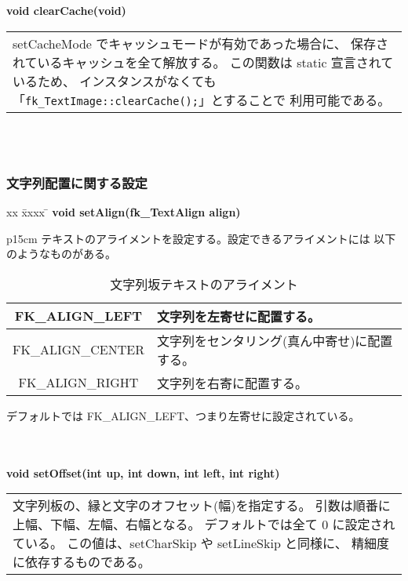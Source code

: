 \begin{tabbing}
\> \textbf{void clearCache(void)} \\
	\> \> \begin{tabular}{p{15cm}}
		setCacheMode でキャッシュモードが有効であった場合に、
		保存されているキャッシュを全て解放する。
		この関数は static 宣言されているため、
		インスタンスがなくても
		「\verb+fk_TextImage::clearCache();+」とすることで
		利用可能である。
	\end{tabular} \\ \\

\end{tabbing}

\subsubsection{文字列配置に関する設定}
\begin{tabbing}
xx \= xxxx \= \kill
\> \textbf{void setAlign(fk\_TextAlign align)} \\
	\> \> \begin{tabular}{p{15cm}}
		テキストのアライメントを設定する。設定できるアライメントには
		以下のようなものがある。
			\begin{table}[H]
			\caption{文字列坂テキストのアライメント}
			\label{tbl:textAlign}
			\begin{center}
			\begin{tabular}{|c|l|}
			\hline
			FK\_ALIGN\_LEFT & 文字列を左寄せに配置する。\\ \hline
			FK\_ALIGN\_CENTER &
			文字列をセンタリング(真ん中寄せ)に配置する。\\ \hline
			FK\_ALIGN\_RIGHT & 文字列を右寄に配置する。\\ \hline
			\end{tabular}
			\end{center}
			\end{table}
		デフォルトでは FK\_ALIGN\_LEFT、つまり左寄せに設定されている。
	\end{tabular} \\ \\

\> \textbf{void setOffset(int up, int down, int left, int right)} \\
	\> \> \begin{tabular}{p{15cm}}
		文字列板の、縁と文字のオフセット(幅)を指定する。
		引数は順番に上幅、下幅、左幅、右幅となる。
		デフォルトでは全て 0 に設定されている。
		この値は、setCharSkip や setLineSkip と同様に、
		精細度に依存するものである。
	\end{tabular} \\ \\


\end{tabbing}

